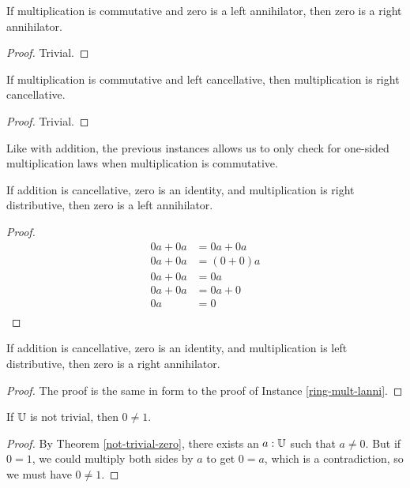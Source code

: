 \documentclass[../math.tex]{subfiles}
\begin{document}
\begin{instance} \label{mult-lanni-ranni}
    If multiplication is commutative and zero is a left annihilator, then zero
    is a right annihilator.
\end{instance}
\begin{proof}
    Trivial.
\end{proof}

\begin{instance}
    If multiplication is commutative and left cancellative, then multiplication
    is right cancellative.
\end{instance}
\begin{proof}
    Trivial.
\end{proof}

Like with addition, the previous instances allows us to only check for one-sided
multiplication laws when multiplication is commutative.

\begin{instance} \label{ring-mult-lanni}
    If addition is cancellative, zero is an identity, and multiplication is
    right distributive, then zero is a left annihilator.
\end{instance}
\begin{proof}
    \begin{align*}
        0a + 0a &= 0a + 0a \\
        0a + 0a &= (0 + 0)a \\
        0a + 0a &= 0a \\
        0a + 0a &= 0a + 0 \\
        0a &= 0 \\
    \end{align*}
\end{proof}

\begin{instance} \label{ring-mult-ranni}
    If addition is cancellative, zero is an identity, and multiplication is
    left distributive, then zero is a right annihilator.
\end{instance}
\begin{proof}
    The proof is the same in form to the proof of Instance
    \ref{ring-mult-lanni}.
\end{proof}

\begin{theorem} \label{not-trivial-one}
    If $\mathbb{U}$ is not trivial, then $0 \neq 1$.
\end{theorem}
\begin{proof}
    By Theorem \ref{not-trivial-zero}, there exists an $a : \mathbb{U}$ such that $a
    \neq 0$.  But if $0 = 1$, we could multiply both sides by $a$ to get $0 =
    a$, which is a contradiction, so we must have $0 \neq 1$.
\end{proof}
\end{document}
